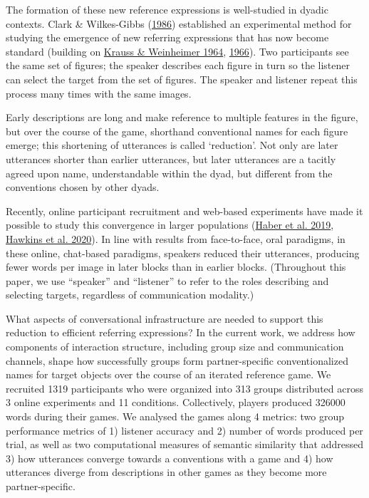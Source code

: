 \documentclass[
  english,
  a4paper,
]{article}
\begin{document}
The formation of these new reference expressions is well-studied in dyadic contexts. Clark \& Wilkes-Gibbs (\protect\hyperlink{ref-clark1986}{1986}) established an experimental method for studying the emergence of new referring expressions that has now become standard (building on \protect\hyperlink{ref-krauss1964}{Krauss \& Weinheimer 1964}, \protect\hyperlink{ref-krauss1966}{1966}). Two participants see the same set of figures; the speaker describes each figure in turn so the listener can select the target from the set of figures. The speaker and listener repeat this process many times with the same images.

Early descriptions are long and make reference to multiple features in the figure, but over the course of the game, shorthand conventional names for each figure emerge; this shortening of utterances is called `reduction'. Not only are later utterances shorter than earlier utterances, but later utterances are a tacitly agreed upon name, understandable within the dyad, but different from the conventions chosen by other dyads.

Recently, online participant recruitment and web-based experiments have made it possible to study this convergence in larger populations (\protect\hyperlink{ref-haber2019}{Haber et al. 2019}, \protect\hyperlink{ref-hawkins2020}{Hawkins et al. 2020}). In line with results from face-to-face, oral paradigms, in these online, chat-based paradigms, speakers reduced their utterances, producing fewer words per image in later blocks than in earlier blocks. (Throughout this paper, we use ``speaker'' and ``listener'' to refer to the roles describing and selecting targets, regardless of communication modality.)

What aspects of conversational infrastructure are needed to support this reduction to efficient referring expressions? In the current work, we address how components of interaction structure, including group size and communication channels, shape how successfully groups form partner-specific conventionalized names for target objects over the course of an iterated reference game. We recruited 1319 participants who were organized into 313 groups distributed across 3 online experiments and 11 conditions. Collectively, players produced 326000 words during their games. We analysed the games along 4 metrics: two group performance metrics of 1) listener accuracy and 2) number of words produced per trial, as well as two computational measures of semantic similarity that addressed 3) how utterances converge towards a conventions with a game and 4) how utterances diverge from descriptions in other games as they become more partner-specific.
\end{document}
